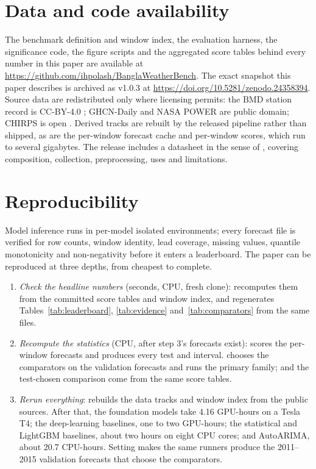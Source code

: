 \section*{Data and code availability}

The benchmark definition and window index, the evaluation harness, the significance code, the figure scripts and
the aggregated score tables behind every number in this paper are available
at \url{https://github.com/ihpolash/BanglaWeatherBench}. The exact snapshot this paper describes is
archived as v1.0.3 at \url{https://doi.org/10.5281/zenodo.24358394}.
Source data are redistributed only where licensing permits: the BMD station record is CC-BY-4.0 \citep{zubair2024bmd}; GHCN-Daily and NASA POWER are public domain; CHIRPS is open \citep{funk2015chirps}. Derived tracks are rebuilt by the released pipeline rather than shipped, as are the per-window forecast cache and per-window scores, which run to several gigabytes. The release includes a datasheet in the
sense of \citet{gebru2021datasheets}, covering composition, collection, preprocessing, uses and limitations.

\section*{Reproducibility}

Model inference runs in per-model isolated environments; every forecast file is verified for row counts, window
identity, lead coverage, missing values, quantile monotonicity and non-negativity before it enters a leaderboard.
The paper can be reproduced at three depths, from cheapest to complete.
\begin{enumerate}
  \item \emph{Check the headline numbers} (seconds, CPU, fresh clone):  recomputes
    them from the committed score tables and window index, and 
    regenerates Tables~\ref{tab:leaderboard}, \ref{tab:evidence} and~\ref{tab:comparators} from the same files.
  \item \emph{Recompute the statistics} (CPU, after step 3's forecasts exist): 
    scores the per-window forecasts and  produces every test and interval.
     chooses the comparators on the validation forecasts and runs the primary
    family;  and the test-chosen comparison come from the same score tables.
  \item \emph{Rerun everything}:  rebuilds the data tracks and window index from the
    public sources. After that, the foundation models take 4.16 GPU-hours on a Tesla T4; the deep-learning
    baselines, one to two GPU-hours; the statistical and LightGBM baselines, about two hours on eight CPU cores; and
    AutoARIMA, about 20.7 CPU-hours. Setting  makes the same runners produce the
    2011--2015 validation forecasts that choose the comparators.
\end{enumerate}
